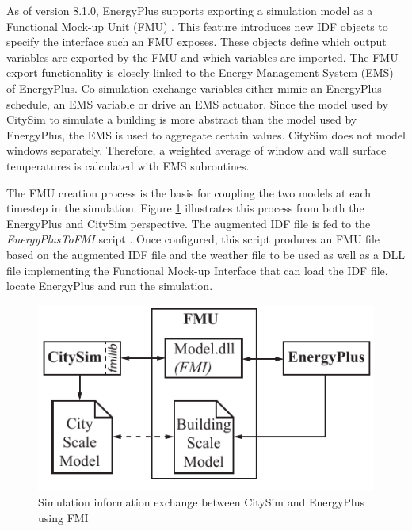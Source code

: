 \documentclass{tBPS2e}
\theoremstyle{plain}
\theoremstyle{definition}
\theoremstyle{remark}
\newcommand{\noteDT}[1]{\footnote{\textcolor{green}{#1}}}
\begin{document}
As of version 8.1.0, EnergyPlus supports exporting a simulation model as a
Functional Mock-up Unit (FMU) \citep{Nouidui:2014hq,Anonymous:ZZTfF80-}. This
feature introduces new IDF objects to specify the interface such an FMU
exposes. These objects define which output variables are exported by the FMU
and which variables are imported. The FMU export functionality is closely
linked to the Energy Management System (EMS) of EnergyPlus. Co-simulation
exchange variables either mimic an EnergyPlus schedule, an EMS variable or
drive an EMS actuator. Since the model used by CitySim to simulate a building
is more abstract than the model used by EnergyPlus, the EMS is used to
aggregate certain values. CitySim does not model windows separately. Therefore,
a weighted average of window and wall surface temperatures is calculated with
EMS subroutines.



The FMU creation process is the basis for coupling the two models at each
timestep in the simulation. Figure \ref{fig:FMUOverview} illustrates this
process from both the EnergyPlus and CitySim perspective. The augmented IDF
file is fed to the \emph{EnergyPlusToFMI} script \citep{Nouidui:2014bo}. Once
configured, this script produces an FMU file based on the augmented IDF file
and the weather file to be used as well as a DLL file implementing the
Functional Mock-up Interface that can load the IDF file, locate EnergyPlus and
run the simulation.

\begin{figure}[H]
\centering
\includegraphics[scale=0.7]{figures/UMEM_FMU_Overview}
\caption{Simulation information exchange between CitySim and EnergyPlus using FMI \citep{thomas2014multiscale}}
\label{fig:FMUOverview}
\end{figure}
\end{document}
